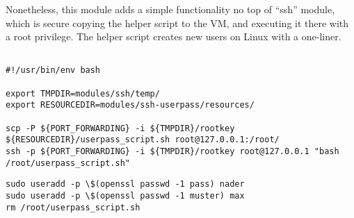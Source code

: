 Nonetheless, this module adds a simple functionality no top of “ssh” module, which is secure copying the helper script to the VM, and executing it there with a root privilege.
The helper script creates new users on Linux with a one-liner.\\

\begin{lstlisting}[caption=ssh-userpass main.sh, style=pythonstyle]

#!/usr/bin/env bash

export TMPDIR=modules/ssh/temp/
export RESOURCEDIR=modules/ssh-userpass/resources/

scp -P ${PORT_FORWARDING} -i ${TMPDIR}/rootkey ${RESOURCEDIR}/userpass_script.sh root@127.0.0.1:/root/
ssh -p ${PORT_FORWARDING} -i ${TMPDIR}/rootkey root@127.0.0.1 "bash /root/userpass_script.sh"
\end{lstlisting}

\begin{lstlisting}[caption=userpass\_script.sh, style=pythonstyle]
sudo useradd -p \$(openssl passwd -1 pass) nader
sudo useradd -p \$(openssl passwd -1 muster) max
rm /root/userpass_script.sh
\end{lstlisting}
